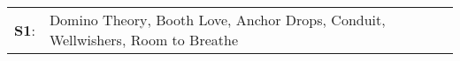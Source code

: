 \begin{supertabular}{p{0.03\textwidth}p{0.92\textwidth}}
 \textbf{S1}:  &  Domino Theory\textsuperscript{}, \enspace Booth Love\textsuperscript{}, \enspace Anchor Drops\textsuperscript{}, \enspace Conduit\textsuperscript{}, \enspace Wellwishers\textsuperscript{}, \enspace Room to Breathe\textsuperscript{}  \enspace  \\
\end{supertabular}
